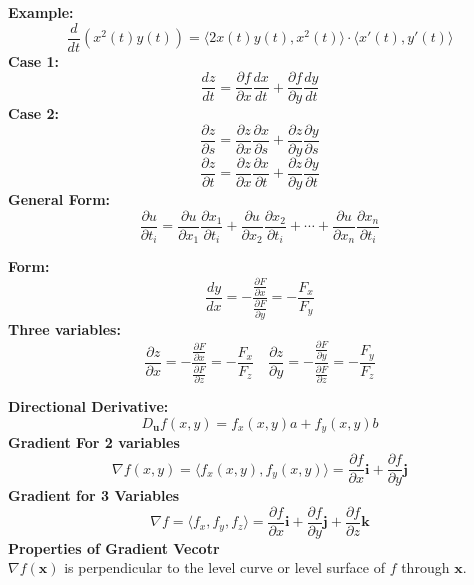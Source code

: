 \documentclass[2pt]{article}
\begin{document}
\begin{multicols}{2}
\begin{tcolorbox}[title=\textbf{Chain Rule}, colframe=lightblue]
    \textbf{Example:}
    \[ \frac{d}{dt} \left( x^2(t) y(t) \right) = \langle 2x(t) y(t), x^2(t) \rangle \cdot \langle x'(t), y'(t) \rangle \] 
    \textbf{Case 1:} 	
    \[ \frac{dz}{dt} = \frac{\partial f}{\partial x} \frac{dx}{dt} + \frac{\partial f}{\partial y} \frac{dy}{dt} \]
    \textbf{Case 2:}
    \[ \frac{\partial z}{\partial s} = \frac{\partial z}{\partial x} \frac{\partial x}{\partial s} + \frac{\partial z}{\partial y} \frac{\partial y}{\partial s} \]
    \[ \frac{\partial z}{\partial t} = \frac{\partial z}{\partial x} \frac{\partial x}{\partial t} + \frac{\partial z}{\partial y} \frac{\partial y}{\partial t} \]
    \textbf{General Form:}
    \[ \frac{\partial u}{\partial t_i} = \frac{\partial u}{\partial x_1} \frac{\partial x_1}{\partial t_i} + \frac{\partial u}{\partial x_2} \frac{\partial x_2}{\partial t_i} + \cdots + \frac{\partial u}{\partial x_n} \frac{\partial x_n}{\partial t_i} \]
\end{tcolorbox}

\begin{tcolorbox}[title=\textbf{Implicit Differentiation}, colframe=lightblue]
    \textbf{Form:} 	
    \[ \frac{dy}{dx} = -\frac{\frac{\partial F}{\partial x}}{\frac{\partial F}{\partial y}} = -\frac{F_x}{F_y} \]
    \textbf{Three variables:}
    \[ \frac{\partial z}{\partial x} = -\frac{\frac{\partial F}{\partial x}}{\frac{\partial F}{\partial z}} = -\frac{F_x}{F_z} \quad \frac{\partial z}{\partial y} = -\frac{\frac{\partial F}{\partial y}}{\frac{\partial F}{\partial z}} = -\frac{F_y}{F_z} \]
\end{tcolorbox}

\begin{tcolorbox}[title=\textbf{Directional Derivative and Gradient Vector}, colframe=lightblue]
    \textbf{Directional Derivative:} 	
    \[ D_{\mathbf{u}} f(x, y) = f_x(x, y) a + f_y(x, y) b \] 
    \textbf{Gradient For 2 variables}
    \[ \nabla f(x, y) = \langle f_x(x, y), f_y(x, y) \rangle = \frac{\partial f}{\partial x} \mathbf{i} + \frac{\partial f}{\partial y} \mathbf{j} \]
    \textbf{Gradient for 3 Variables} 
    \[ \nabla f = \langle f_x, f_y, f_z \rangle = \frac{\partial f}{\partial x} \mathbf{i} + \frac{\partial f}{\partial y} \mathbf{j} + \frac{\partial f}{\partial z} \mathbf{k} \] 
    \textbf{Properties of Gradient Vecotr} \\
    \( \nabla f(\mathbf{x}) \) is perpendicular to the level curve or level surface of \( f \) through \( \mathbf{x} \). \\


\end{tcolorbox}
\end{multicols}
\end{document}
